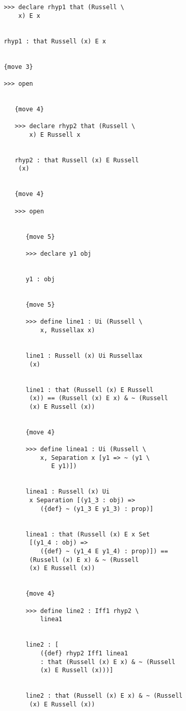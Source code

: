 \documentclass[12pt]{article}
\begin{document}
\begin{verbatim}
         >>> declare rhyp1 that (Russell \
             x) E x


         rhyp1 : that Russell (x) E x


         {move 3}

         >>> open


            {move 4}

            >>> declare rhyp2 that (Russell \
                x) E Russell x


            rhyp2 : that Russell (x) E Russell 
             (x)


            {move 4}

            >>> open


               {move 5}

               >>> declare y1 obj


               y1 : obj


               {move 5}

               >>> define line1 : Ui (Russell \
                   x, Russellax x)


               line1 : Russell (x) Ui Russellax 
                (x)


               line1 : that (Russell (x) E Russell 
                (x)) == (Russell (x) E x) & ~ (Russell 
                (x) E Russell (x))


               {move 4}

               >>> define linea1 : Ui (Russell \
                   x, Separation x [y1 => ~ (y1 \
                      E y1)])


               linea1 : Russell (x) Ui 
                x Separation [(y1_3 : obj) => 
                   ({def} ~ (y1_3 E y1_3) : prop)]


               linea1 : that (Russell (x) E x Set 
                [(y1_4 : obj) => 
                   ({def} ~ (y1_4 E y1_4) : prop)]) == 
                (Russell (x) E x) & ~ (Russell 
                (x) E Russell (x))


               {move 4}

               >>> define line2 : Iff1 rhyp2 \
                   linea1


               line2 : [
                   ({def} rhyp2 Iff1 linea1 
                   : that (Russell (x) E x) & ~ (Russell 
                   (x) E Russell (x)))]


               line2 : that (Russell (x) E x) & ~ (Russell 
                (x) E Russell (x))



\end{verbatim}
\end{document}

